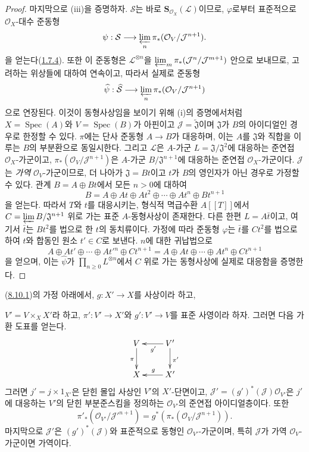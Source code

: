 \begin{proof}
마지막으로 (iii)을 증명하자. $\mathcal{S}$는 바로
$\mathbf{S}_{\mathcal{O}_X}(\mathcal{L})$이므로, $\varphi$로부터
표준적으로 $\mathcal{O}_X$-대수 준동형
\[
  \psi:\mathcal{S}\longrightarrow
  \varprojlim_n\pi_*(\mathcal{O}_V/\mathcal{J}^{n+1}).
\]
을 얻는다(\hyperref[II.1.7.4-ko]{1.7.4}). 또한 이 준동형은
$\mathcal{L}^{\otimes n}$을
$\varprojlim_m\pi_*(\mathcal{J}^n/\mathcal{J}^{m+1})$ 안으로 보내므로,
고려하는 위상들에 대하여 연속이고, 따라서 실제로 준동형
\[
  \widehat{\psi}:\widehat{\mathcal{S}}\longrightarrow
  \varprojlim_n\pi_*(\mathcal{O}_V/\mathcal{J}^{n+1})
\]
으로 연장된다. 이것이 동형사상임을 보이기 위해 (i)의 증명에서처럼
$X=\operatorname{Spec}(A)$와 $V=\operatorname{Spec}(B)$가 아핀이고
$\mathcal{J}=\widetilde{\mathfrak{J}}$이며 $\mathfrak{J}$가 $B$의
아이디얼인 경우로 한정할 수 있다. $\pi$에는 단사 준동형
$A\to B$가 대응하며, 이는 $A$를 $\mathfrak{J}$와 직합을 이루는
$B$의 부분환으로 동일시한다. 그리고 $\mathcal{L}$은
$A$-가군 $L=\mathfrak{J}/\mathfrak{J}^2$에 대응하는 준연접
$\mathcal{O}_X$-가군이고,
$\pi_*(\mathcal{O}_V/\mathcal{J}^{n+1})$은
$A$-가군 $B/\mathfrak{J}^{n+1}$에 대응하는 준연접
$\mathcal{O}_X$-가군이다. $\mathcal{J}$는 \emph{가역}
$\mathcal{O}_V$-가군이므로, 더 나아가
$\mathfrak{J}=Bt$이고 $t$가 $B$의 영인자가 아닌 경우로 가정할 수
있다. 관계 $B=A\oplus Bt$에서 모든 $n>0$에 대하여
\[
  B=A\oplus At\oplus At^2\oplus\cdots\oplus At^n\oplus Bt^{n+1}
\]
을 얻는다. 따라서 $T$와 $t$를 대응시키는, 형식적 멱급수환
$A[[T]]$에서 $C=\varprojlim B/\mathfrak{J}^{n+1}$ 위로 가는 표준
$A$-동형사상이 존재한다. 다른 한편
$L=A\bar t$이고, 여기서 $\bar t$는 $Bt^2$를 법으로 한 $t$의
동치류이다. 가정에 따라 준동형 $\varphi$는 $\bar t$를 $Ct^2$를
법으로 하여 $t$와 합동인 원소 $t'\in C$로 보낸다. $n$에 대한
귀납법으로
\[
  A\oplus At'\oplus\cdots\oplus At'{}^n\oplus Ct^{n+1}
  =A\oplus At\oplus\cdots\oplus At^n\oplus Ct^{n+1}
\]
을 얻으며, 이는 $\widehat{\psi}$가
$\prod_{n\geqslant0}L^{\otimes n}$에서 $C$ 위로 가는 동형사상에
실제로 대응함을 증명한다.
\end{proof}

\begin{lemma}[8.10.2]
\label{II.8.10.2-ko}
(\hyperref[II.8.10.1-ko]{8.10.1})의 가정 아래에서,
$g:X'\to X$를 사상이라 하고,

$V'=V\times_X X'$라 하고, $\pi':V'\to X'$와
$g':V'\to V$를 표준 사영이라 하자. 그러면 다음 가환 도표를 얻는다.
\[
  \xymatrix{
    V\ar[d]_{\pi} & V'\ar[l]^{g'}\ar[d]^{\pi'}\\
    X & X'\ar[l]_{g}
  }
\]
그러면 $j'=j\times1_{X'}$은 닫힌 몰입 사상인 $V'$의 $X'$-단면이고,
$\mathcal{J}'=(g')^*(\mathcal{J})\mathcal{O}_{V'}$은 $j'$에 대응하는
$V'$의 닫힌 부분준스킴을 정의하는 $\mathcal{O}_{V'}$의 준연접
아이디얼층이다. 또한
\[
  \pi'_*(\mathcal{O}_{V'}/\mathcal{J}'^{n+1})
  =g^*(\pi_*(\mathcal{O}_V/\mathcal{J}^{n+1})).
\]
마지막으로 $\mathcal{J}'$은 $(g')^*(\mathcal{J})$와 표준적으로 동형인
$\mathcal{O}_{V'}$-가군이며, 특히 $\mathcal{J}$가 가역
$\mathcal{O}_V$-가군이면 가역이다.
\end{lemma}

